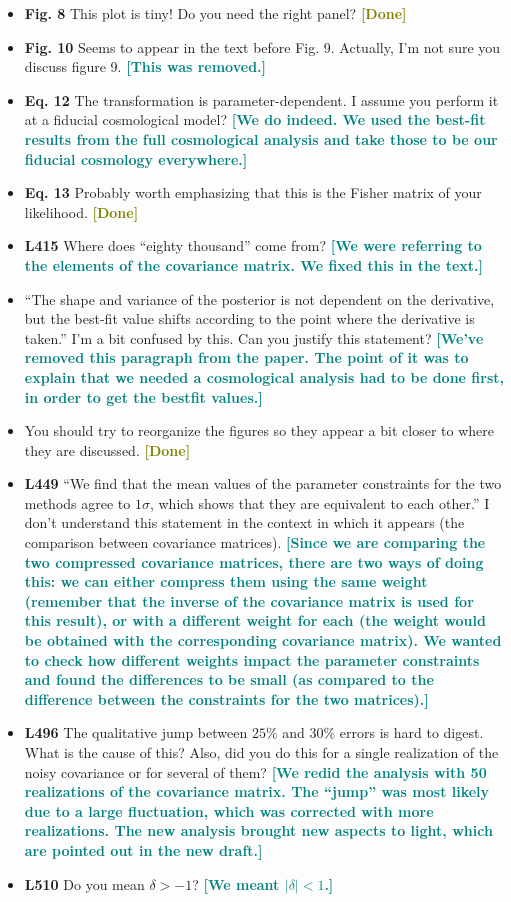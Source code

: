 \documentclass{article}
\newcommand\reply[1]{{\bf {\textcolor{teal}{[#1]}}}}
\newcommand\done{{\bf {\textcolor{olive}{[Done]}}}}
\begin{document}
\begin{itemize}
	\item \textbf{Fig. 8} This plot is tiny! Do you need the right panel? \done
	\item \textbf{Fig. 10} Seems to appear in the text before Fig. 9. Actually, I'm not sure you discuss figure 9. \reply{This was removed.}
	\item \textbf{Eq. 12} The transformation is parameter-dependent. I assume you perform it at a fiducial cosmological model? \reply{We do indeed. We used the best-fit results from the full cosmological analysis and take those to be our fiducial cosmology everywhere.}
	\item \textbf{Eq. 13} Probably worth emphasizing that this is the Fisher matrix of your likelihood. \done
	\item \textbf{L415} Where does “eighty thousand” come from? \reply{We were referring to the elements of the covariance matrix. We fixed this in the text.}
	\item “The shape and variance of the posterior is not dependent on the derivative, but the best-fit value shifts according to the point where the derivative is taken.” I'm a bit confused by this. Can you justify this statement? \reply{We've removed this paragraph from the paper. The point of it was to explain that we needed a cosmological analysis had to be done first, in order to get the bestfit values.}
	\item You should try to reorganize the figures so they appear a bit closer to where they are discussed. \done
	\item \textbf{L449} “We find that the mean values of the parameter constraints for the two methods agree to $1 \sigma$, which shows that they are equivalent to each other.” I don't understand this statement in the context in which it appears (the comparison between covariance matrices). \reply{Since we are comparing the two compressed covariance matrices, there are two ways of doing this: we can either compress them using the same weight (remember that the inverse of the covariance matrix is used for this result), or with a different weight for each (the weight would be obtained with the corresponding covariance matrix). We wanted to check how different weights impact the parameter constraints and found the differences to be small (as compared to the difference between the constraints for the two matrices).}
	\item \textbf{L496} The qualitative jump between $25\%$ and $30\%$ errors is hard to digest. What is the cause of this? Also, did you do this for a single realization of the noisy covariance or for several of them? \reply{We redid the analysis with 50 realizations of the covariance matrix. The “jump” was most likely due to a large fluctuation, which was corrected with more realizations. The new analysis brought new aspects to light, which are pointed out in the new draft.}
	\item \textbf{L510} Do you mean $\delta > -1$? \reply{We meant $|\delta| < 1$.} \\
	\end{itemize}
\end{document}
